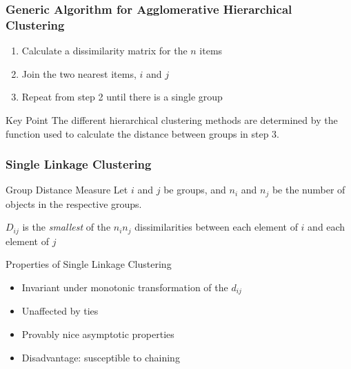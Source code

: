 \documentclass{beamer}
\begin{document}
\begin{frame}
  \frametitle{Generic Algorithm for Agglomerative Hierarchical Clustering}


\begin{enumerate}
  \item Calculate a dissimilarity matrix for the $n$ items
  
  \item Join the two nearest items, $i$ and $j$


  \item Repeat from step 2 until there is a single group
\end{enumerate}

\begin{block}{Key Point}
 The different hierarchical clustering methods are determined by the function used to calculate the distance between groups in step 3.
\end{block}

\end{frame}

\begin{frame}
  \frametitle{Single Linkage Clustering}

\begin{block}{Group Distance Measure}
  Let $i$ and $j$ be groups, and $n_i$ and $n_j$ be the number of objects in the respective groups. 

  \smallskip

  $D_{ij}$ is the \emph{smallest} of the $n_i n_j$ dissimilarities between each element of $i$ and each element of $j$
\end{block}

Properties of Single Linkage Clustering
\begin{itemize}

\item Invariant under monotonic transformation of the $d_{ij}$

\item Unaffected by ties

\item Provably nice asymptotic properties

\item Disadvantage: susceptible to chaining

\end{itemize}

\end{frame}
\end{document}
